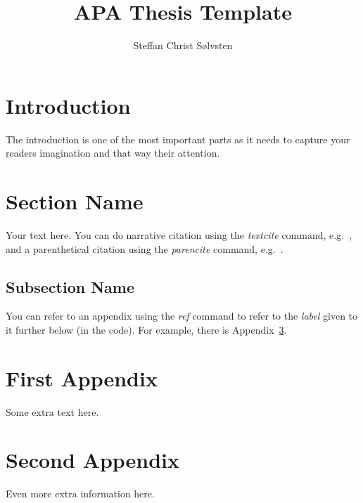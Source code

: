 \documentclass[
    a4paper, %
    man,     %
    donotrepeattitle
]{apa7}
\title{APA Thesis Template}
\author{Steffan Christ S{\o}lvsten}
\affiliation{Department of Computer Science, Aarhus University}
\begin{document}
\maketitle

\tableofcontents

\newpage
\section{Introduction}
The introduction is one of the most important parts as it needs to capture your
readers imagination and that way their attention.

\newpage
\section{Section Name}
Your text here. You can do narrative citation using the \emph{textcite} command,
e.g.\ \textcite{soelvsten2022:TACAS}, and a parenthetical citation using the
\emph{parencite} command, e.g.\ \parencite{soelvsten2022:TACAS}.

\subsection{Subsection Name}
You can refer to an appendix using the \emph{ref} command to refer to the
\emph{label} given to it further below (in the code). For example, there is
Appendix~\ref{app:first}.

\printbibliography

\appendix
\section{First Appendix} \label{app:first}
Some extra text here.

\section{Second Appendix} \label{app:second}
Even more extra information here.
\end{document}
